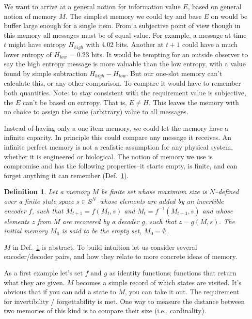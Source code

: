 \documentclass[9pt,twocolumn,twoside]{pnas-new}
\newtheorem{definition}{Definition}
\begin{document}
We want to arrive at a general notion for information value $E$, based on general notion of memory $M$. The simplest memory we could try and base $E$ on would be buffer large enough for a single item. From a subjective point of view though in this memory all messages must be of equal value. For example, a message at time $t$ might have entropy $H_{high}$ with 4.02 bits. Another at $t+1$ could have a much lower entropy of $H_{low}$ = 0.23 bits.  It would be tempting for an outside observer to say the high entropy message is more valuable than the low entropy, with a value found by simple subtraction $H_{high} - H_{low}$. But our one-slot memory can't calculate this, or any other comparison. To compare it would have to remember both quantities. Note: to stay consistent with the requirement value is subjective, the $E$ can't be based on entropy. That is, $E \neq H$. This leaves the memory with no choice to assign the same (arbitrary) value to all messages.

Instead of having only a one item memory, we could let the memory have a infinite capacity. In principle this could compare any message it receives. An infinite perfect memory is not a realistic assumption for any physical system, whether it is engineered or biological. The notion of memory we use is compromise and has the following properties--it starts empty, is finite, and can forget anything it can remember (Def.~\ref{def:memory}). 

\begin{definition}
    \label{def:memory}
    Let a memory $M$ be finite set whose maximum size is $N$--defined over a finite state space $s \in S^N$--whose elements are added by an invertible encoder $f$, such that $M_{t+1} = f(M_{t}, s)$ and $M_{t} = f^{-1}(M_{t+1}, s)$ and whose elements $z$ from $M$ are recovered by a decoder $g$, such that $z = g(M, s)$. The initial memory $M_{0}$ is said to be the empty set, $M_{0} = \emptyset$.
\end{definition}

$M$ in Def.~\ref{def:memory} is abstract. To build intuition let us consider several encoder/decoder pairs, and how they relate to more concrete ideas of memory.

As a first example let's set $f$ and $g$ as identity functions; functions that return what they are given. $M$ becomes a simple record of which states are visited. It's obvious that if you can add a state to $M$, you can take it out. The requirement for invertibility / forgettability is met. One way to measure the distance between two memories of this kind is to compare their size (i.e., cardinality).
\end{document}
